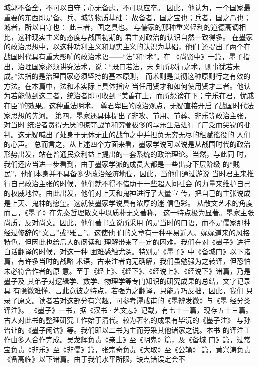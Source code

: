 \documentclass[12pt,UTF8]{ctexbook}
\begin{document}
城郭不备全，不可以自守；心无备虑，不可以应卒。 
因此，他认为，一个国家最重要的东西即是备、兵、城等物质基础： 
故备者，国之宝也；兵者，国之爪也；城者，所以自守也： 
此三者，国之具也。 
与儒家的那种重义轻利的道德高调相比，这种现实主义的态度与战国初期的 
君主对政治的认识自然一致得多。 
在墨家的政治思想中，以这种功利主义和现实主义的认识为基础，他们 
还提出了两个在战国时代具有重大影响的政治术语——“法”和“术”。在 
《尚贤中》一篇，墨子指出，治理国家必须讲究法术，说：“既曰若法，未 
知所以行之术，则事犹若未成。”法指的是治理国家必须坚持的基本原则， 
而术则是贯彻这种原则行之有效的方法。在本篇中，法和术实际上具体指应 
当任用贤才和如何使用贤才二者。他认为若能做到这二者，统治者即可收到 
“美善在上，而所怨谤在下；宁乐在君，忧戚在臣”的效果。这种重法明术、 
尊君卑臣的政治观点，无疑直接开启了战国时代法家思想的先河。 
第四，墨家还具体提出了非攻、节用、节葬、非乐等政治主张，对当时 
统治者贪得无厌的掠夺战争和穷奢极侈的享乐生活进行了广泛而尖锐的批 
判。这无疑喊出了处身于无休无止的战争之中并担负无穷无尽的租赋徭役的 
人们的心声。 
总而言之，从上述四个方面来看，墨家学说可以说是从战国时代的政治 
形势出发，站在普通民众利益上提出的一套系统的政治理论。当然，与此同 
时，我们还应当进一步看到，由于墨家学派的成员大都是一些出身下层阶级 
的“贱民”，他们本身并不具备多少政治经济地位，因此，当他们通过游说 
当时君主来推行自己政治主张的时候，他们就不得不借助于一些超人间社会 
的力量来维护自己的权威地位。由此出发，他们对上天和鬼神进行了大量宣 
传，把自己的主张说成是上天、鬼神的愿望。这就使墨家学说具有浓厚的迷 
信色彩。 
从散文艺术的角度而言，《墨子》在先秦哲理散文中以质朴无文著称， 
这一特点极为显著。墨家主张尚质，反对尚文。因此，他们著书立说所采用 
的是当时的口语，而不是儒家那种经过修辞的“文言”或“雅言”。这使他 
们的文章有一种平易近人、娓娓道来的风格特色，但因此也给后人的阅读和 
理解带来了一定的困难。我们在对《墨子》进行白话翻译的时候，对这一种 
困难感触尤深。特别是《墨子》中《备城门》以下诸篇，有许多当时的战略 
术语，古来注者向无确解，我们虽勉强为之转译，但恐怕未必符合作者的原 
意。至于《经上》、《经下》、《经说上》、《经说下》诸篇，乃是墨子及 
其弟子对逻辑学、数学、物理学等专门知识的研究成果的总结，文字记录具 
有隐微难懂、言此意彼之特点，若强为之翻译，只能弄巧反拙，因此，我们 
只录了原文。读者若对这部分有兴趣，可参考谭戒甫的《墨辨发微》与《墨 
经分类译注》。 
《墨子》一书，据《汉书·艺文志》记载，有七十一篇，现存五十三篇。 
古人对此书的整理研究工作始于清代。较为著名的成果有毕沅的《墨子注》 
与孙诒让的《墨子闲诂》等。我们即以二书为主而旁采其他诸家之说。本书 
的译注工作由多人合作完成。吴龙辉负责《亲士》至《明鬼》篇，及《备城 
门》篇，过常宝负责《非乐》至《非儒》篇，张宗奇负责《大取》至《公输》 
篇，黄兴涛负责《备高临》以下诸篇。由于我们水平所限，缺点错误定会不 
\end{document}
